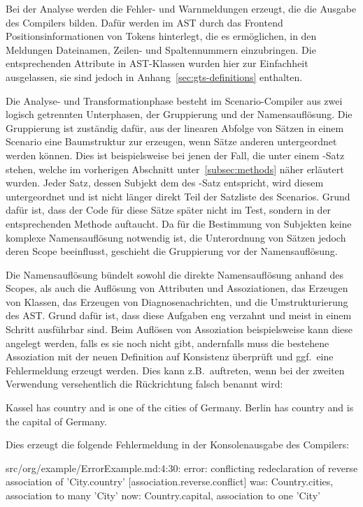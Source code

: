 Bei der Analyse werden die Fehler- und Warnmeldungen erzeugt, die die Ausgabe des Compilers bilden.
Dafür werden im AST durch das Frontend Positionsinformationen von Tokens hinterlegt, die es ermöglichen,
in den Meldungen Dateinamen, Zeilen- und Spaltennummern einzubringen.
Die entsprechenden Attribute in AST-Klassen wurden hier zur Einfachheit ausgelassen,
sie sind jedoch in Anhang~\ref{sec:gts-definitions} enthalten.

Die Analyse- und Transformationphase besteht im Scenario-Compiler aus zwei logisch getrennten Unterphasen,
der Gruppierung und der Namensauflösung.
Die Gruppierung ist zuständig dafür, aus der linearen Abfolge von Sätzen in einem Scenario eine Baumstruktur zur erzeugen,
wenn Sätze anderen untergeordnet werden können.
Dies ist beispielsweise bei jenen der Fall, die unter einem -Satz stehen, welche im vorherigen Abschnitt unter~\ref{subsec:methods} näher erläutert wurden.
Jeder Satz, dessen Subjekt dem des -Satz entspricht, wird diesem untergeordnet und ist nicht länger direkt Teil der Satzliste des Scenarios.
Grund dafür ist, dass der Code für diese Sätze später nicht im Test, sondern in der entsprechenden Methode auftaucht.
Da für die Bestimmung von Subjekten keine komplexe Namensauflösung notwendig ist,
die Unterordnung von Sätzen jedoch deren Scope beeinflusst, geschieht die Gruppierung vor der Namensauflösung.

Die Namensauflösung bündelt sowohl die direkte Namensauflösung anhand des Scopes,
als auch die Auflösung von Attributen und Assoziationen, das Erzeugen von Klassen, das Erzeugen von Diagnosenachrichten,
und die Umstrukturierung des AST\@.
Grund dafür ist, dass diese Aufgaben eng verzahnt und meist in einem Schritt ausführbar sind.
Beim Auflösen von Assoziation beispielsweise kann diese angelegt werden, falls es sie noch nicht gibt,
andernfalls muss die bestehene Assoziation mit der neuen Definition auf Konsistenz überprüft und ggf.\ eine Fehlermeldung erzeugt werden.
Dies kann z.B.\ auftreten, wenn bei der zweiten Verwendung versehentlich die Rückrichtung falsch benannt wird:

\begin{codeblock}
    Kassel has country and is one of the cities of Germany.
    Berlin has country and is the capital of Germany.
\end{codeblock}

Dies erzeugt die folgende Fehlermeldung in der Konsolenausgabe des Compilers:

\begin{codeblock}
    src/org/example/ErrorExample.md:4:30: error: conflicting redeclaration of reverse association of 'City.country' [association.reverse.conflict]
    was: Country.cities, association to many 'City'
    now: Country.capital, association to one 'City'
\end{codeblock}

